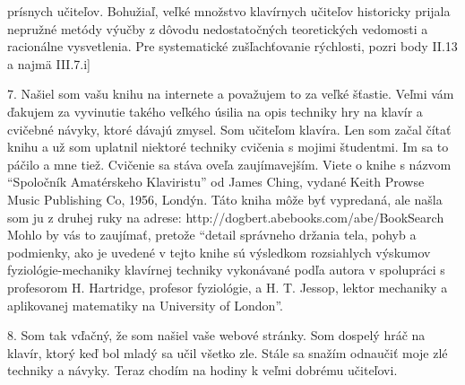 prísnych učiteľov. Bohužiaľ, veľké množstvo klavírnych učiteľov historicky prijala nepružné metódy výučby z dôvodu nedostatočných teoretických vedomosti a racionálne vysvetlenia. Pre systematické zušľachťovanie rýchlosti, pozri body II.13 a najmä III.7.i]
\medskip

7. Našiel som vašu knihu na internete a považujem to za veľké šťastie. Veľmi vám ďakujem za vyvinutie takého veľkého úsilia na opis techniky hry na klavír a cvičebné návyky, ktoré dávajú zmysel. Som učiteľom klavíra. Len som začal čítať knihu a už som uplatnil niektoré techniky cvičenia s mojimi študentmi. Im sa to páčilo a mne tiež. Cvičenie sa stáva oveľa zaujímavejším. Viete o knihe s názvom “Spoločník Amatérskeho Klaviristu” od James Ching, vydané Keith Prowse Music Publishing Co, 1956, Londýn. Táto kniha môže byť vypredaná, ale našla som ju z druhej ruky na adrese:
http://dogbert.abebooks.com/abe/BookSearch
Mohlo by vás to zaujímať, pretože “detail správneho držania tela, pohyb a podmienky, ako je uvedené v tejto knihe sú výsledkom rozsiahlych výskumov fyziológie-mechaniky klavírnej techniky vykonávané podľa autora v spolupráci s profesorom H. Hartridge, profesor fyziológie, a H. T. Jessop, lektor mechaniky a aplikovanej matematiky na University of London”.
\medskip

8. Som tak vďačný, že som našiel vaše webové stránky. Som dospelý hráč na klavír, ktorý keď bol mladý sa učil všetko zle. Stále sa snažím odnaučiť moje zlé techniky a návyky. Teraz chodím na hodiny k veľmi dobrému učiteľovi.
\medskip

